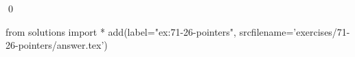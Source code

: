 
\begin{ex}
  \label{ex:71-26-pointers}
  
  \qed
\end{ex}
\begin{python0}
from solutions import *
add(label="ex:71-26-pointers",
    srcfilename='exercises/71-26-pointers/answer.tex')
\end{python0}
